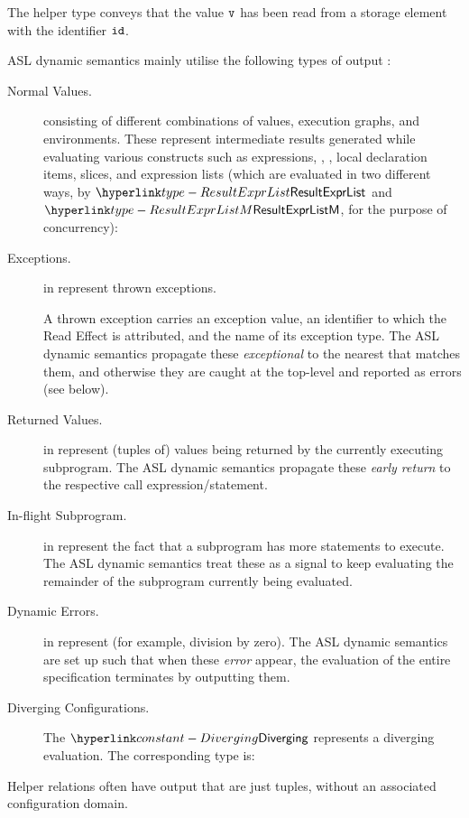 The helper type  conveys that the value $\texttt{v}$ has been read
from a storage element with the identifier $\texttt{id}$.

ASL dynamic semantics mainly utilise the following types of output \semanticsconfigurationsterm{}:
\begin{description}
  \item[Normal Values.]\hypertarget{def-normal}{}
  \Semanticsconfigurationsterm{} consisting of different combinations of values,
  execution graphs, and environments. These represent intermediate results
  generated while evaluating various constructs such as
  expressions, \sideeffectfreeexpressionsterm{}, \assignableexpressions,
  local declaration items, slices, and expression lists
  (which are evaluated in two different ways, by $\ResultExprList$ and $\ResultExprListM$, for the purpose of concurrency):

  \item[Exceptions.] \Semanticsconfigurationsterm{} in  represent thrown exceptions.

  A thrown exception carries an exception value,
  an identifier to which the Read Effect is attributed, and the name of its exception type.
  The ASL dynamic semantics propagate these \emph{exceptional \semanticsconfigurationsterm{}} to the nearest \catcherterm{} that matches
  them, and otherwise they are caught at the top-level and reported as errors (see \dynamicerrorsterm{} below).

  \item[Returned Values.] \Semanticsconfigurationsterm{} in 
  represent (tuples of) values being returned by the currently executing subprogram.
  The ASL dynamic semantics propagate these \emph{early return \semanticsconfigurationsterm{}} to the respective call expression/statement.

  \item[In-flight Subprogram.] \Semanticsconfigurationsterm{} in 
  represent the fact that a subprogram has more statements to execute.
  The ASL dynamic semantics treat these \semanticsconfigurationsterm{} as a signal to keep evaluating the remainder
  of the subprogram currently being evaluated.

  \item[Dynamic Errors.] \Semanticsconfigurationsterm{} in
  represent \dynamicerrorsterm{} (for example, division by zero).
  The ASL dynamic semantics are set up such that when these \emph{error \semanticsconfigurationsterm{}} appear,
  the evaluation of the entire specification terminates by outputting them.

  \item[Diverging Configurations.] The \semanticsconfigurationterm{} $\Diverging$
  represents a diverging evaluation.
  The corresponding type is:

\end{description}
Helper relations often have output \semanticsconfigurationsterm{} that are just tuples, without an associated configuration domain.


